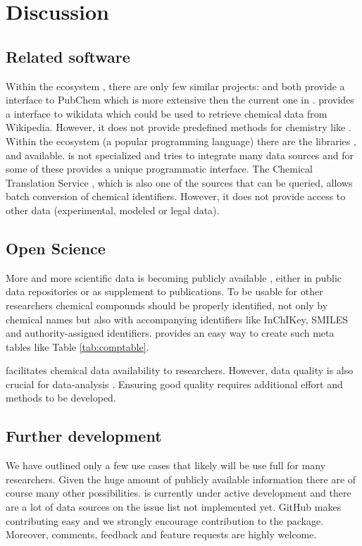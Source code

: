 \documentclass[article, shortnames]{jss}\usepackage[]{graphicx}\usepackage[]{color}
\begin{document}
\section[Discussion]{Discussion}
\subsection[Related software]{Related software}
Within the  ecosystem , there are only few similar projects:
 \citep{rpubchem_2014} and  \citep{chemminer_2008}  both provide a interface to PubChem which is more extensive then the current one in .
 \citep{wikidatar_2016} provides a interface to wikidata which could be used to retrieve chemical data from Wikipedia.
However, it does not provide predefined methods for chemistry like .
Within the  ecosystem (a popular programming language) there are the libraries  \citep{pubchempy},  \citep{chemspipy} and  \citep{cirpy} available.
 is not specialized and tries to integrate many data sources and for some of these provides a unique programmatic interface.
The Chemical Translation Service \citep{Wohlgemuth_Haldiya_Willighagen_Kind_Fiehn_2010}, which is also one of the sources that can be queried,  allows batch conversion of chemical identifiers.
However, it does not provide access to other data (experimental, modeled or legal data).


\subsection[Open Science]{Open Science}
More and more scientific data is becoming publicly available \citep{Gewin_2016, Reichman_Jones_Schildhauer_2011,Boyle_Guha_2011}, either in public data repositories or as supplement to publications.
To be usable for other researchers chemical compounds should be properly identified, not only by chemical names but also with accompanying identifiers like InChIKey, SMILES and authority-assigned identifiers.
 provides an easy way to create such meta tables like Table \ref{tab:comptable}.

 facilitates chemical data availability to researchers.
However, data quality is also crucial for data-analysis \citep{Stieger_2014}. 
Ensuring good quality requires additional effort and methods to be developed.


\subsection[Further development]{Further development}
We have outlined only a few use cases that likely will be use full for many researchers.
Given the huge amount of publicly available information there are of course many other possibilities.
 is currently under active development and there are a lot of data sources on the issue list not implemented yet.
GitHub makes contributing easy and we strongly encourage contribution to the package.
Moreover, comments, feedback and feature requests are highly welcome.
\end{document}
